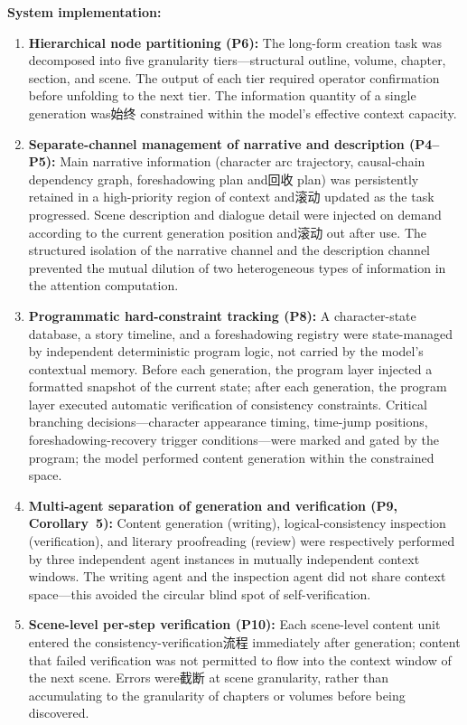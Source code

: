 \documentclass[11pt,a4paper]{article}
\theoremstyle{definition}
\begin{document}
\textbf{System implementation:}
\begin{enumerate}[leftmargin=*,itemsep=0.3em]
    \item \textbf{Hierarchical node partitioning (P6):} The long-form creation task was decomposed into five granularity tiers---structural outline, volume, chapter, section, and scene. The output of each tier required operator confirmation before unfolding to the next tier. The information quantity of a single generation was始终 constrained within the model's effective context capacity.
    \item \textbf{Separate-channel management of narrative and description (P4--P5):} Main narrative information (character arc trajectory, causal-chain dependency graph, foreshadowing plan and回收 plan) was persistently retained in a high-priority region of context and滚动 updated as the task progressed. Scene description and dialogue detail were injected on demand according to the current generation position and滚动 out after use. The structured isolation of the narrative channel and the description channel prevented the mutual dilution of two heterogeneous types of information in the attention computation.
    \item \textbf{Programmatic hard-constraint tracking (P8):} A character-state database, a story timeline, and a foreshadowing registry were state-managed by independent deterministic program logic, not carried by the model's contextual memory. Before each generation, the program layer injected a formatted snapshot of the current state; after each generation, the program layer executed automatic verification of consistency constraints. Critical branching decisions---character appearance timing, time-jump positions, foreshadowing-recovery trigger conditions---were marked and gated by the program; the model performed content generation within the constrained space.
    \item \textbf{Multi-agent separation of generation and verification (P9, Corollary~5):} Content generation (writing), logical-consistency inspection (verification), and literary proofreading (review) were respectively performed by three independent agent instances in mutually independent context windows. The writing agent and the inspection agent did not share context space---this avoided the circular blind spot of self-verification.
    \item \textbf{Scene-level per-step verification (P10):} Each scene-level content unit entered the consistency-verification流程 immediately after generation; content that failed verification was not permitted to flow into the context window of the next scene. Errors were截断 at scene granularity, rather than accumulating to the granularity of chapters or volumes before being discovered.
\end{enumerate}
\end{document}
